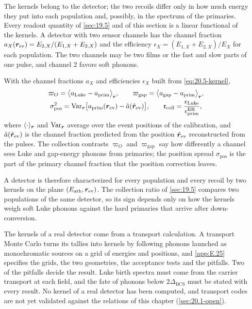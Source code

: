 The kernels belong to the detector; the two recoils differ only in how much energy they put into each population and, possibly, in the spectrum of the primaries. Every readout quantity of \cref{sec:19.5} and of this section is a linear functional of the kernels. A detector with two sensor channels has the channel fraction $a_X(\bm{r}_{\mathrm{ev}}) = E_{2,X}/(E_{1,X} + E_{2,X})$ and the efficiency $\epsilon_X = (E_{1,X} + E_{2,X})/E_X$ for each population. The two channels may be two films or the fast and slow parts of one pulse, and channel 2 favors soft phonons.
\begin{keyresult}
With the channel fractions $a_X$ and efficiencies $\epsilon_X$ built from \cref{eq:20.5-kernel},
\begin{gather}
  \varpi_O = \bigl\langle a_{\mathrm{Luke}} - a_{\mathrm{prim}}\bigr\rangle_{\bm{r}} , \qquad
  \varpi_{\mathrm{gap}} = \bigl\langle a_{\mathrm{gap}} - a_{\mathrm{prim}}\bigr\rangle_{\bm{r}} , \nonumber\\
  \sigma_{\mathrm{pos}}^2 = \operatorname{Var}_{\bm{r}}\bigl[a_{\mathrm{prim}}(\bm{r}_{\mathrm{ev}}) - \hat a(\hat{\bm{r}}_{\mathrm{ev}})\bigr] , \qquad
  \mathfrak{r}_{\mathrm{coll}} = \frac{\epsilon_{\mathrm{Luke}}}{\epsilon^{\mathrm{ER}}_{\mathrm{prim}}} ,
  \label{eq:20.5-functionals}
\end{gather}
where $\langle\cdot\rangle_{\bm{r}}$ and $\operatorname{Var}_{\bm{r}}$ average over the event positions of the calibration, and $\hat a(\hat{\bm{r}}_{\mathrm{ev}})$ is the channel fraction predicted from the position $\hat{\bm{r}}_{\mathrm{ev}}$ reconstructed from the pulses. The collection contrasts $\varpi_O$ and $\varpi_{\mathrm{gap}}$ say how differently a channel sees Luke and gap-energy phonons from primaries; the position spread $\sigma_{\mathrm{pos}}$ is the part of the primary channel fraction that the position correction leaves.
\end{keyresult}
\noindent A detector is therefore characterized for every population and every recoil by two kernels on the plane $(E_{\mathrm{ath}}, \bm{r}_{\mathrm{ev}})$. The collection ratio of \cref{sec:19.5} compares two populations of the same detector, so its sign depends only on how the kernels weigh soft Luke phonons against the hard primaries that arrive after down-conversion.

The kernels of a real detector come from a transport calculation. A transport Monte Carlo turns its tallies into kernels by following phonons launched as monochromatic sources on a grid of energies and positions, and \cref{app:E.25} specifies the grids, the two geometries, the acceptance tests and the pitfalls. Two of the pitfalls decide the result. Luke birth spectra must come from the carrier transport at each field, and the fate of phonons below $2\Delta_{\mathrm{BCS}}$ must be stated with every result. No kernel of a real detector has been computed, and transport codes are not yet validated against the relations of this chapter (\cref{sec:20.1-open}).

